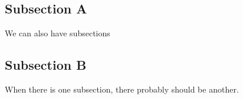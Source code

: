 \subsection{Subsection A}
\begin{frame}{\mbox{}}
We can also have subsections
\end{frame}
%
%
%
%
%
\subsection{Subsection B}
\begin{frame}{\mbox{}}
When there is one subsection, there probably should be another.
\end{frame}
%
%
%
%
%
